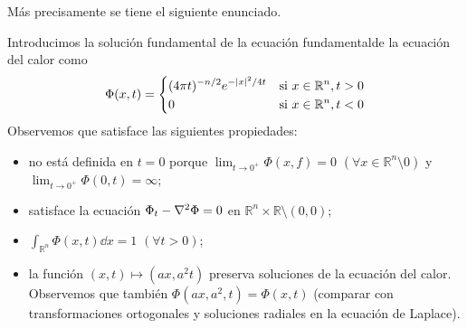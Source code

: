 \documentclass{article}
\newcommand{\realNumbers}{\mathbb{R}}
\theoremstyle{definition}
\theoremstyle{remark}
\begin{document}
  Más precisamente se tiene el siguiente enunciado.


  Introducimos la solución fundamental de la ecuación fundamentalde la ecuación del calor como
  \begin{align}
    \label{solution:fundamentalSolutionOfHeatEquation}
    \Phi(x, t)
    =
    \left\{
      \begin{aligned}
        &(4 \pi t)^{- n / 2} e^{- \abs{x}^2 / 4 t}
          & \text{si } x \in \realNumbers^n, t > 0
        \\
        &0
          & \text{si } x \in \realNumbers^n, t < 0
      \end{aligned}
    \right.
  \end{align}
  Observemos que satisface las siguientes propiedades:
  \begin{itemize}
    \item no está definida en \(t = 0\) porque
    \(\lim_{t \rightarrow 0^+} \Phi(x, f) = 0\) \((\forall x \in \realNumbers^n \setminus 0)\) y \(\lim_{t \rightarrow 0^+} \Phi(0, t) = \infty\);
    \item satisface la ecuación \(\Phi_t - \laplacian \Phi = 0\) en \(\realNumbers^n \times \realNumbers \setminus (0, 0)\);
    \item \(\int_{\realNumbers^n} \Phi(x, t) \dd x = 1\) \((\forall t > 0)\);
    \item la función \((x, t) \mapsto (a x, a^2 t)\) preserva soluciones de la ecuación del calor.
    Observemos que también \(\Phi(a x, a^2, t) = \Phi(x, t)\) (comparar con transformaciones ortogonales y soluciones radiales en la ecuación de Laplace).
  \end{itemize}
\end{document}
